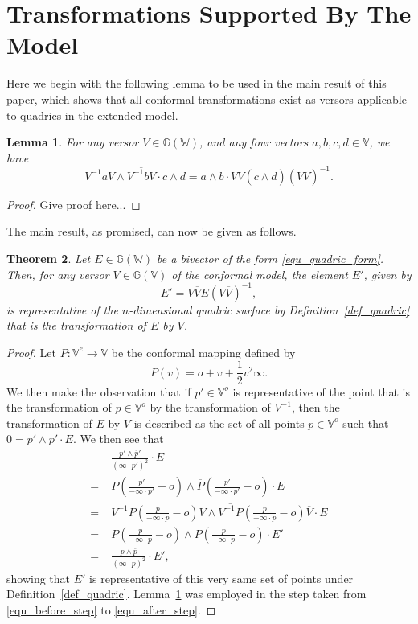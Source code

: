 \documentclass{birkjour}
\newtheorem{thm}{Theorem}[section]
\newtheorem{lem}[thm]{Lemma}
\theoremstyle{definition}
\theoremstyle{remark}
\numberwithin{equation}{section}
\newcommand{\G}{\mathbb{G}}
\newcommand{\V}{\mathbb{V}}
\newcommand{\W}{\mathbb{W}}
\newcommand{\nvao}{o}
\newcommand{\nvai}{\infty}
\begin{document}
\section{Transformations Supported By The Model}

Here we begin with the following lemma to be used in the main result
of this paper, which shows that all conformal transformations exist
as versors applicable to quadrics in the extended model.
\begin{lem}\label{lma_versor_transfer}
For any versor $V\in\G(\W)$, and any four vectors $a,b,c,d\in\V$, we have
\begin{equation}
V^{-1}aV\wedge\overline{V^{-1}bV}\cdot c\wedge\overline{d} =
a\wedge\overline{b}\cdot V\overline{V}(c\wedge\overline{d})(V\overline{V})^{-1}.
\end{equation}
\end{lem}
\begin{proof}
Give proof here...
\end{proof}
The main result, as promised, can now be given as follows.
\begin{thm}\label{thm_main_result}
Let $E\in\G(\W)$ be a bivector of the form \eqref{equ_quadric_form}.
Then, for any versor $V\in\G(\V)$ of the conformal model, the element $E'$, given by
\begin{equation}
E' = V\overline{V}E(V\overline{V})^{-1},
\end{equation}
is representative of the $n$-dimensional quadric surface by Definition~\ref{def_quadric}
that is the transformation of $E$ by $V$.
\end{thm}
\begin{proof}
Let $P:\V^e\to\V$ be the conformal mapping defined by
\begin{equation}
P(v) = \nvao + v + \frac{1}{2}v^2\nvai.
\end{equation}
We then make the observation that if $p'\in\V^o$ is representative of
the point that is the transformation of $p\in\V^o$ by the transformation
of $V^{-1}$, then the transformation of $E$ by $V$ is described as the set of
all points $p\in\V^o$ such that $0=p'\wedge\overline{p}'\cdot E$.
We then see that
\begin{align}
 & \frac{p'\wedge\overline{p}'}{(\nvai\cdot p')^2}\cdot E \\
=\;& P\left(\frac{p'}{-\nvai\cdot p'}-\nvao\right)
\wedge\overline{P}\left(\frac{p'}{-\nvai\cdot p'}-\nvao\right)\cdot E \\
=\;& V^{-1}P\left(\frac{p}{-\nvai\cdot p}-\nvao\right)V
\wedge\overline{V^{-1}P}\left(\frac{p}{-\nvai\cdot p}-\nvao\right)\overline{V}\cdot E\label{equ_before_step} \\
=\;& P\left(\frac{p}{-\nvai\cdot p}-\nvao\right)\wedge
\overline{P}\left(\frac{p}{-\nvai\cdot p}-\nvao\right)\cdot E'\label{equ_after_step} \\
=\;& \frac{p\wedge\overline{p}}{(\nvai\cdot p)^2}\cdot E',
\end{align}
showing that $E'$ is representative of this very same set of
points under Definition~\ref{def_quadric}.  Lemma~\ref{lma_versor_transfer}
was employed in the step taken from \eqref{equ_before_step} to \eqref{equ_after_step}.
\end{proof}
\end{document}
